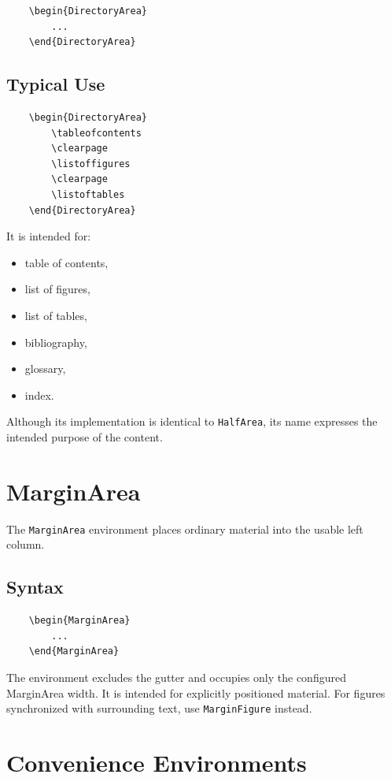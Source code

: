 \documentclass[
11pt,
a4paper,
oneside
]{scrbook}
\begin{document}
\begin{verbatim}
	\begin{DirectoryArea}
		...
	\end{DirectoryArea}
\end{verbatim}

\subsection{Typical Use}

\begin{verbatim}
	\begin{DirectoryArea}
		\tableofcontents
		\clearpage
		\listoffigures
		\clearpage
		\listoftables
	\end{DirectoryArea}
\end{verbatim}
It is intended for:
\begin{itemize}
	\item table of contents,
	\item list of figures,
	\item list of tables,
	\item bibliography,
	\item glossary,
	\item index.
\end{itemize}
Although its implementation is identical to \texttt{HalfArea}, its name
expresses the intended purpose of the content.

\section{MarginArea}

The \texttt{MarginArea} environment places ordinary material into the usable
left column.

\subsection{Syntax}

\begin{verbatim}
	\begin{MarginArea}
		...
	\end{MarginArea}
\end{verbatim}
The environment excludes the gutter and occupies only the configured
MarginArea width.
It is intended for explicitly positioned material.
For figures synchronized with surrounding text, use
\texttt{MarginFigure} instead.

\section{Convenience Environments}
\end{document}
